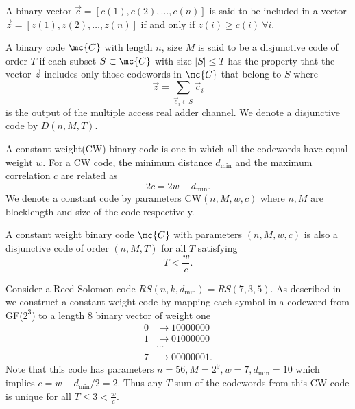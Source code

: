 \documentclass[final,onecolumn,12pt]{IEEEtran}
\def\dmin{d_{\mathrm{min}}}
\begin{document}
\begin{definition}
A binary vector $\vec{c}=[c(1),c(2),\ldots,c(n)]$ is said to be included in a vector  $\vec{z}=[z(1),z(2),\ldots,z(n)]$ if and only if $z(i)\geq c(i)~\forall i$.
\end{definition}

\begin{definition}
A binary code $\mc{C}$ with length $n$, size $M$ is said to be a disjunctive code of order $T$ if each subset $S\subset \mc{C}$ with size $|S|\leq T$ has the property that the vector $\vec{z}$ includes only those codewords in $\mc{C}$ that belong to $S$ where
\begin{equation}
\vec{z}=\sum_{\vec{c}_i\in S}\vec{c}_i
\label{eqn:mac_adder}
\end{equation}
is the output of the multiple access real adder channel. We denote a disjunctive code by $D(n,M,T)$.
\end{definition}

\begin{definition}
A constant weight(CW) binary code is one in which all the codewords have equal weight $w$. For a CW code, the minimum distance $d_{\text{min}}$ and the maximum correlation $c$ are related as
\[
2c=2w-\dmin.
\]
We denote a constant code by parameters CW$(n,M,w,c)$ where $n, M$ are blocklength and size of the code respectively.
\end{definition}
\begin{lemma}
\label{lem:fandisjunctive_code}
A constant weight binary code $\mc{C}$ with parameters $(n,M,w,c)$ is also a disjunctive code of order $(n,M,T)$ for all $T$ satisfying
\[
T<\frac{w}{c}.
\]
\end{lemma}

\begin{example}
Consider a Reed-Solomon code $RS(n,k,\dmin)=RS(7,3,5)$. As described in \cite{fan1995superimposed} we construct a constant weight code by mapping each symbol in a codeword from GF($2^3$) to a length $8$ binary vector of weight one
\begin{align*}
0&\rightarrow 10000000\\
1&\rightarrow 01000000\\
&\cdots	\\
7&\rightarrow 00000001.
\end{align*}
Note that this code has parameters $n=56,M=2^9, w=7,\dmin=10$ which implies $c=w-\dmin/2=2$. Thus any $T$-sum of the codewords from this CW code is unique for all $T\leq 3<\frac{w}{c}$.
\end{example}
\end{document}
